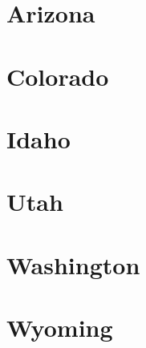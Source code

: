 \maketoc


{%

\chapter{Arizona}
}


\chapter{Colorado}


\chapter{Idaho}


\chapter{Utah}


\chapter{Washington}


\chapter{Wyoming}




